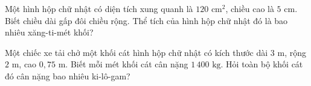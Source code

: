 \begin{ex} %
Một hình hộp chữ nhật có diện tích xung quanh là $120\text{ cm}^2$, chiều cao là $5\text{ cm}$. Biết chiều dài gấp đôi chiều rộng. Thể tích của hình hộp chữ nhật đó là bao nhiêu xăng-ti-mét khối?
\end{ex}

\begin{ex} %
Một chiếc xe tải chở một khối cát hình hộp chữ nhật có kích thước dài $3\text{ m}$, rộng $2\text{ m}$, cao $0{,}75\text{ m}$. Biết mỗi mét khối cát cân nặng $1\,400\text{ kg}$. Hỏi toàn bộ khối cát đó cân nặng bao nhiêu ki-lô-gam?
\end{ex}

